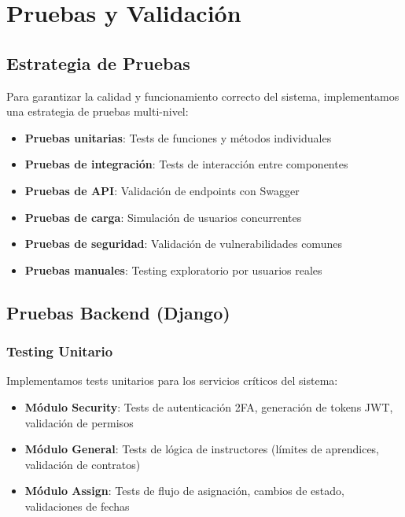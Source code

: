 \section{Pruebas y Validación}

\subsection{Estrategia de Pruebas}

Para garantizar la calidad y funcionamiento correcto del sistema, implementamos una estrategia de pruebas multi-nivel:

\begin{itemize}
    \item \textbf{Pruebas unitarias}: Tests de funciones y métodos individuales
    \item \textbf{Pruebas de integración}: Tests de interacción entre componentes
    \item \textbf{Pruebas de API}: Validación de endpoints con Swagger
    \item \textbf{Pruebas de carga}: Simulación de usuarios concurrentes
    \item \textbf{Pruebas de seguridad}: Validación de vulnerabilidades comunes
    \item \textbf{Pruebas manuales}: Testing exploratorio por usuarios reales
\end{itemize}

\subsection{Pruebas Backend (Django)}

\subsubsection{Testing Unitario}

Implementamos tests unitarios para los servicios críticos del sistema:

\begin{itemize}
    \item \textbf{Módulo Security}: Tests de autenticación 2FA, generación de tokens JWT, validación de permisos
    \item \textbf{Módulo General}: Tests de lógica de instructores (límites de aprendices, validación de contratos)
    \item \textbf{Módulo Assign}: Tests de flujo de asignación, cambios de estado, validaciones de fechas
\end{itemize}


